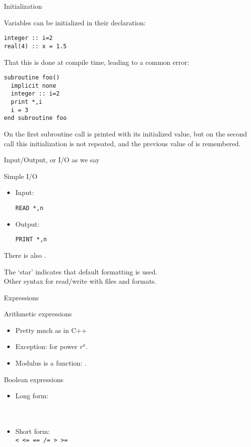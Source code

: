  {Initialization}

Variables can be initialized in their declaration:
\begin{lstlisting}
integer :: i=2
real(4) :: x = 1.5
\end{lstlisting}

That this is done at compile time, leading to a common error:
\begin{lstlisting}
subroutine foo()
  implicit none
  integer :: i=2
  print *,i
  i = 3
end subroutine foo
\end{lstlisting}
On the first subroutine call  is printed with its initialized
value, but on the second call this initialization is not repeated, and
the previous value of  is remembered.

 {Input/Output, or I/O as we say}
\label{sec:fio}

\begin{block}{Simple I/O}
  \label{sl:frw}
  \begin{itemize}
  \item Input: 
\begin{lstlisting}
READ *,n
\end{lstlisting}
\item Output:
\begin{lstlisting}
PRINT *,n
\end{lstlisting}
  \end{itemize}
  There is also .

  The `star' indicates that default formatting is used.\\
  Other syntax for read/write with files and formats.
\end{block}

 {Expressions}
\label{sec:fexpr}

\begin{block}{Arithmetic expressions}
  \label{sl:farith}
  \begin{itemize}
  \item Pretty much as in C++
  \item Exception:  for power $r^a$.
  \item Modulus is a function: .
  \end{itemize}
\end{block}

\begin{block}{Boolean expressions}
  \label{sl:fbool}
  \begin{itemize}
  \item 
    Long form:\\
    \\
    \\
  \item Short form:\\
    \verb+< <= == /= > >=+
  \end{itemize}
\end{block}

